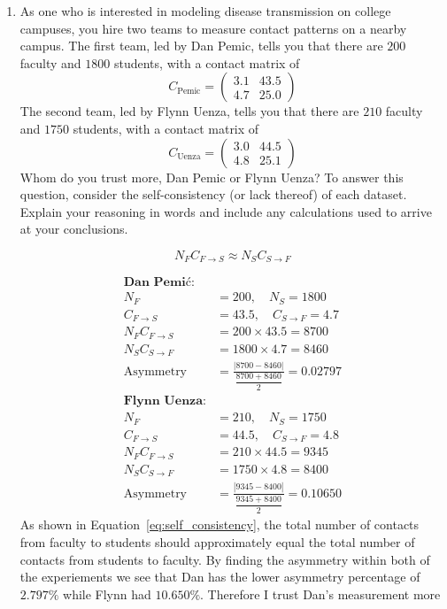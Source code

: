 \documentclass[11pt]{article}
\begin{document}
\begin{enumerate}
\begin{enumerate}[label=\alph*.]
	\item As one who is interested in modeling disease transmission on college campuses, you hire two teams to measure contact patterns on a nearby campus. The first team, led by Dan Pemic, tells you that there are $200$ faculty and $1800$ students, with a contact matrix of 
	$$C_\text{Pemic} = \begin{pmatrix}
		3.1 & 43.5 \\
		4.7 & 25.0
	\end{pmatrix}$$
The second team, led by Flynn Uenza, tells you that there are $210$ faculty and $1750$ students, with a contact matrix of
	$$C_\text{Uenza} = \begin{pmatrix}
		3.0 & 44.5 \\
		4.8 & 25.1
		\end{pmatrix}
	$$
Whom do you trust more, Dan Pemic or Flynn Uenza? To answer this question, consider the self-consistency (or lack thereof) of each dataset. Explain your reasoning in words and include any calculations used to arrive at your conclusions. 
\par
\begin{equation}
    N_F C_{F \to S} \approx N_S C_{S \to F}
    \label{eq:self_consistency}
\end{equation}

\begin{align*}
	\textbf{Dan Pemić:} \\
	N_F &= 200, \quad N_S = 1800 \\
	C_{F \to S} &= 43.5, \quad C_{S \to F} = 4.7 \\[6pt]
	N_F C_{F \to S} &= 200 \times 43.5 = 8700 \\
	N_S C_{S \to F} &= 1800 \times 4.7 = 8460 \\[6pt]
	\text{Asymmetry} &= 
	\frac{|8700 - 8460|}{\dfrac{8700 + 8460}{2}} 
	= \mathbf{0.02797} \\[12pt]
	\textbf{Flynn Uenza:} \\
	N_F &= 210, \quad N_S = 1750 \\
	C_{F \to S} &= 44.5, \quad C_{S \to F} = 4.8 \\[6pt]
	N_F C_{F \to S} &= 210 \times 44.5 = 9345 \\
	N_S C_{S \to F} &= 1750 \times 4.8 = 8400 \\[6pt]
	\text{Asymmetry} &= 
	\frac{|9345 - 8400|}{\dfrac{9345 + 8400}{2}} 
	= \mathbf{0.10650}
\end{align*}
As shown in Equation~\ref{eq:self_consistency}, the total number of contacts from faculty to students should approximately equal the total number of contacts from students to faculty.
By finding the asymmetry within both of the experiements we see that Dan has the lower asymmetry percentage of $2.797\%$
while Flynn had $10.650\%$. Therefore I trust Dan's measurement more


\end{enumerate}
\end{enumerate}
\end{document}
